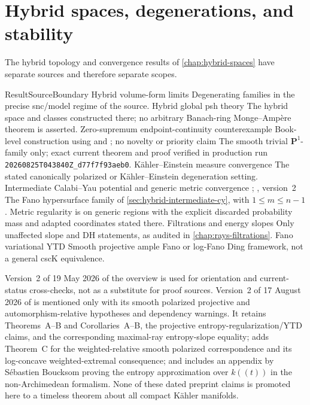 \section{Hybrid spaces, degenerations, and stability}
\label{sec:appL-hybrid}

The hybrid topology and convergence results of \cref{chap:hybrid-spaces} have separate
sources and therefore separate scopes.

\begin{AppLProvenanceLedger}{Result}{Source}{Boundary}
\AppLProvenanceRecord
  {Hybrid volume-form limits}
  {\cite{BJ17Hybrid}}
  {Degenerating families in the precise snc/model regime of the source.}
\AppLProvenanceRecord
  {Hybrid global psh theory}
  {\cite{PS23Hybrid}}
  {The hybrid space and classes constructed there; no arbitrary Banach-ring
   Monge--Ampère theorem is asserted.}
\AppLProvenanceRecord
  {Zero-supremum endpoint-continuity counterexample}
  {Book-level construction using \cite[Definition~3.9 and
   Theorems~3.10, 3.13]{PS23Hybrid} and
   \cite[Definition~4.1]{Favre20Hybrid}; no novelty or priority claim}
  {The smooth trivial \(\mathbf P^1\)-family only; exact current theorem and
   proof verified in production run
   \texttt{20260825T043840Z\_d77f7f93aeb0}.}
\AppLProvenanceRecord
  {Kähler--Einstein measure convergence}
  {\cite{PS22HybridKE}}
  {The stated canonically polarized or Kähler--Einstein degeneration
   setting.}
\AppLProvenanceRecord
  {Intermediate Calabi--Yau potential and generic metric convergence}
  {\cite[Theorem~1.1, Proposition~6.13]{Li25Intermediate};
   \cite[Theorem~1.1, Corollary~5.1]{LT26Intermediate}, version~2}
  {The Fano hypersurface family of
   \cref{sec:hybrid-intermediate-cy}, with $1\leq m\leq n-1$.
   Metric regularity is on generic regions with the explicit discarded
   probability mass and adapted coordinates stated there.}
\AppLProvenanceRecord
  {Filtrations and energy slopes}
  {\cite{BHJ17,BHJ19err}}
  {Only unaffected slope and DH statements, as audited in
   \cref{chap:rays-filtrations}.}
\AppLProvenanceRecord
  {Fano variational YTD}
  {\cite{BBJ21}}
  {Smooth projective ample Fano or log-Fano Ding framework, not a general
   cscK equivalence.}
\end{AppLProvenanceLedger}

Version~2 of 19 May 2026 of the overview \cite{BJ26ComplexNA} is used for
orientation and current-status cross-checks, not as a substitute for proof
sources.  Version~2 of 17 August 2026 of \cite{Trusiani26} is mentioned only
with its smooth polarized projective and automorphism-relative hypotheses and
dependency warnings.  It retains Theorems~A--B and Corollaries~A--B, the
projective entropy-regularization/YTD claims, and the corresponding
maximal-ray entropy-slope equality; adds Theorem~C for the weighted-relative
smooth polarized correspondence and its log-concave weighted-extremal
consequence; and includes an appendix by S\'ebastien Boucksom proving the
entropy approximation over \(k((t))\) in the non-Archimedean formalism.  None
of these dated preprint claims is promoted here to a timeless theorem about
all compact Kähler manifolds.

